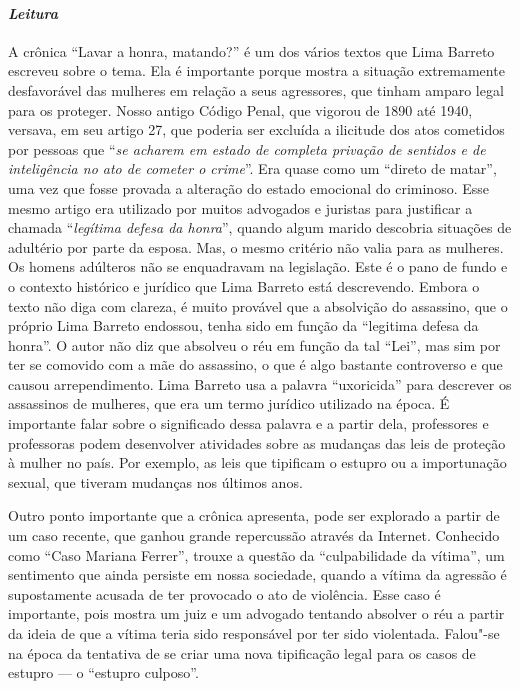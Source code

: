 \documentclass[11pt]{extarticle}
\begin{document}
\paragraph{\textit{Leitura}}
	
A crônica ``Lavar a honra, matando?'' é um dos vários textos
que Lima Barreto escreveu sobre o tema. Ela é importante porque mostra a
situação extremamente desfavorável das mulheres em relação a seus
agressores, que tinham amparo legal para os proteger. Nosso antigo
Código Penal, que vigorou de 1890 até 1940, versava, em seu artigo 27,
que poderia ser excluída a ilicitude dos atos cometidos por pessoas que
``\emph{se acharem em estado de completa privação de sentidos e de
inteligência no ato de cometer o crime}''. Era quase como um ``direto de
matar'', uma vez que fosse provada a alteração do estado emocional do
criminoso. Esse mesmo artigo era utilizado por muitos advogados e
juristas para justificar a chamada ``\emph{legítima defesa da honra}'',
quando algum marido descobria situações de adultério por parte da
esposa. Mas, o mesmo critério não valia para as mulheres. Os homens
adúlteros não se enquadravam na legislação. Este é o pano de fundo e o
contexto histórico e jurídico que Lima Barreto está descrevendo. Embora
o texto não diga com clareza, é muito provável que a absolvição do
assassino, que o próprio Lima Barreto endossou, tenha sido em função da
``legitima defesa da honra''. O autor não diz que absolveu o réu em
função da tal ``Lei'', mas sim por ter se comovido com a mãe do
assassino, o que é algo bastante controverso e que causou arrependimento.
Lima Barreto usa a palavra ``uxoricida'' para descrever os assassinos de
mulheres, que era um termo jurídico utilizado na época. É importante
falar sobre o significado dessa palavra e a partir dela, professores e
professoras podem desenvolver atividades sobre as mudanças das leis de
proteção à mulher no país. Por exemplo, as leis que tipificam o estupro
ou a importunação sexual, que tiveram mudanças nos últimos anos.

Outro ponto importante que a crônica apresenta, pode ser explorado a
partir de um caso recente, que ganhou grande repercussão através da
Internet. Conhecido como ``Caso Mariana Ferrer'', trouxe a questão da
``culpabilidade da vítima'', um sentimento que ainda persiste em nossa
sociedade, quando a vítima da agressão é supostamente acusada de ter
provocado o ato de violência. Esse caso é importante, pois mostra um
juiz e um advogado tentando absolver o réu a partir da ideia de que a
vítima teria sido responsável por ter sido violentada. Falou"-se na época
da tentativa de se criar uma nova tipificação legal para os casos de
estupro --- o ``estupro culposo''.
\end{document}
